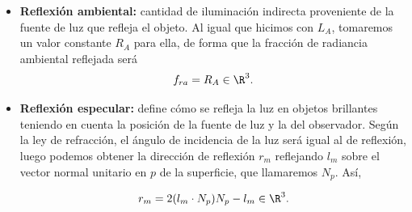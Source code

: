 \begin{itemize}
    \item \textbf{Reflexión ambiental:} cantidad de iluminación indirecta proveniente de la fuente de luz que refleja el objeto. Al igual que hicimos con $L_A$, tomaremos un valor constante $R_A$ para ella, de forma que la fracción de radiancia ambiental reflejada será
    \begin{equation*}
        f_{ra} =  R_A \in \R^3.
    \end{equation*}
    \item \textbf{Reflexión especular:} define cómo se refleja la luz en objetos brillantes teniendo en cuenta la posición de la fuente de luz y la del observador. Según la ley de refracción, el ángulo de incidencia de la luz será igual al de reflexión, luego podemos obtener la dirección de reflexión $r_m$ reflejando $l_m$ sobre el vector normal unitario en $p$ de la superficie, que llamaremos $N_p$. Así,
    
    \begin{equation*}
        r_m = 2(l_m\cdot N_p)N_p - l_m \in \R^3.
    \end{equation*}


\end{itemize}
